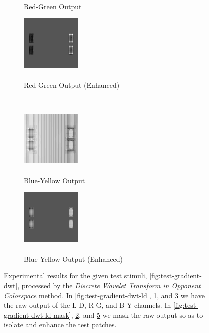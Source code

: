 \documentclass[journal,onecolumn]{IEEEtran}
\begin{document}
{\begin{figure}[H]
\begin{subfigure}[b]{0.5\textwidth}
            \caption{\\ Red-Green Output}
            \label{fig:test-gradient-dwt-rg}
    \end{subfigure}%
    \begin{subfigure}[b]{0.5\textwidth}
            \centering
            \includegraphics[width=108px, frame]{test-gradient-dwt-rg-mask}
            \caption{\\ Red-Green Output (Enhanced)}
            \label{fig:test-gradient-dwt-rg-mask}
    \end{subfigure}\\
    \begin{subfigure}[b]{0.5\textwidth}
            \centering
            \includegraphics[width=108px, frame]{test-gradient-dwt-by}
            \caption{\\ Blue-Yellow Output}
            \label{fig:test-gradient-dwt-by}
    \end{subfigure}%
    \begin{subfigure}[b]{0.5\textwidth}
            \centering
            \includegraphics[width=108px, frame]{test-gradient-dwt-by-mask}
            \caption{\\ Blue-Yellow Output (Enhanced)}
            \label{fig:test-gradient-dwt-by-mask}
    \end{subfigure}
    \caption{Experimental results for the given test stimuli, \ref{fig:test-gradient-dwt}, processed by the \textit{Discrete Wavelet Transform in Opponent Colorspace} method. In \ref{fig:test-gradient-dwt-ld}, \ref{fig:test-gradient-dwt-rg}, and \ref{fig:test-gradient-dwt-by} we have the raw output of the L-D, R-G, and B-Y channels. In \ref{fig:test-gradient-dwt-ld-mask}, \ref{fig:test-gradient-dwt-rg-mask}, and \ref{fig:test-gradient-dwt-by-mask} we mask the raw output so as to isolate and enhance the test patches.}
\end{figure}
\clearpage
}
\end{document}
